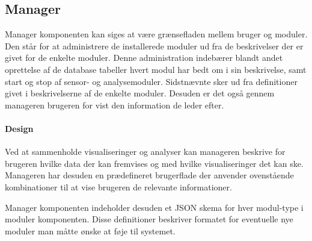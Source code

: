 \subsection{Manager}\label{subsec:arkitektur-Manager}
Manager komponenten kan siges at være grænsefladen mellem bruger og moduler.
Den står for at administrere de installerede moduler ud fra de beskrivelser der er givet for de enkelte moduler.
Denne administration indebærer blandt andet oprettelse af de database tabeller hvert modul har bedt om i sin beskrivelse, samt start og stop af sensor- og analysemoduler.
Sidstnævnte sker ud fra definitioner givet i beskrivelserne af de enkelte moduler.
Desuden er det også gennem manageren brugeren for vist den information de leder efter.

\paragraph{Design}
Ved at sammenholde visualiseringer og analyser kan manageren beskrive for brugeren hvilke data der kan fremvises og med hvilke visualiseringer det kan ske.
Manageren har desuden en prædefineret brugerflade der anvender ovenstående kombinationer til at vise brugeren de relevante informationer.

Manager komponenten indeholder desuden et JSON skema for hver modul-type i moduler komponenten.
Disse definitioner beskriver formatet for eventuelle nye moduler man måtte ønske at føje til systemet.

